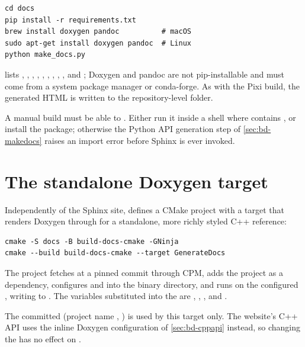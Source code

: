 \begin{lstlisting}[language=shell]
cd docs
pip install -r requirements.txt
brew install doxygen pandoc          # macOS
sudo apt-get install doxygen pandoc  # Linux
python make_docs.py
\end{lstlisting}

 lists , ,
, , , ,
, , , and
; Doxygen and pandoc are not pip-installable and must
come from a system package manager or conda-forge. As with the Pixi build, the
generated HTML is written to the repository-level  folder.

\begin{lupntwarning}
A manual build must be able to . Either run it inside a
shell where  contains , or install the package;
otherwise the Python API generation step of \cref{sec:bd-makedocs} raises an
import error before Sphinx is ever invoked.
\end{lupntwarning}

\section{The standalone Doxygen target}
\label{sec:bd-doxygen}

Independently of the Sphinx site,  defines a
 CMake project with a  target that renders
Doxygen through  for a standalone, more richly styled C++ reference:

\begin{lstlisting}[language=shell]
cmake -S docs -B build-docs-cmake -GNinja
cmake --build build-docs-cmake --target GenerateDocs
\end{lstlisting}

The project fetches  at a pinned commit through CPM, adds the
 project as a dependency, configures  and
 into the binary directory, and runs
 on the configured ,
writing to . The variables substituted into the
 are ,
, , and
.

\begin{lupntnote}
The committed  (project name ,
) is used by this target only. The website's
C++ API uses the inline Doxygen configuration of \cref{sec:bd-cppapi} instead,
so changing the  has no effect on .
\end{lupntnote}

